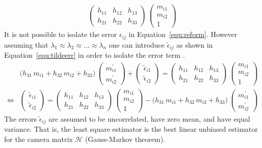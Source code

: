\documentclass[12pt,a4paper,oneside,openright]{book}
\newcommand{\Ie}{That is, }
\newcommand{\equ}[1]{Equation~\ref{equ:#1}}
\begin{document}
\begin{CJK}{UTF8}{}
\begin{equation}
\begin{split}
    \begin{pmatrix}h_{11}&h_{12}&h_{13}\\h_{21}&h_{22}&h_{33}\end{pmatrix}\,
    \begin{pmatrix}m_{i1}\\m_{i2}\\1\end{pmatrix}
  \end{split}
\end{equation}
It is not possible to isolate the error $\epsilon_{ij}$ in \equ{reform}. However assuming that $\lambda_1\approx\lambda_2\approx\ldots\approx\lambda_n$ one can introduce $\widetilde{\epsilon}_{ij}$ as shown in \equ{tildeerr} in order to isolate the error term \citep{zhang2000flexible}.
\begin{equation}\label{equ:tildeerr}
  \begin{split}
    &\big(h_{31}\,m_{i1}+h_{32}\,m_{i2}+h_{33}\big)\,\begin{pmatrix}m^\prime_{i1}\\m^\prime_{i2}\end{pmatrix}+
    \begin{pmatrix}\widetilde{\epsilon}_{i1}\\\widetilde{\epsilon}_{i2}\end{pmatrix}=
    \begin{pmatrix}h_{11}&h_{12}&h_{13}\\h_{21}&h_{22}&h_{33}\end{pmatrix}\,
    \begin{pmatrix}m_{i1}\\m_{i2}\\1\end{pmatrix}\\
    \Leftrightarrow&\begin{pmatrix}\widetilde{\epsilon}_{i1}\\\widetilde{\epsilon}_{i2}\end{pmatrix}=
    \begin{pmatrix}h_{11}&h_{12}&h_{13}\\h_{21}&h_{22}&h_{33}\end{pmatrix}\,
    \begin{pmatrix}m_{i1}\\m_{i2}\\1\end{pmatrix}-
    \big(h_{31}\,m_{i1}+h_{32}\,m_{i2}+h_{33}\big)\,\begin{pmatrix}m^\prime_{i1}\\m^\prime_{i2}\end{pmatrix}
  \end{split}
\end{equation}
The errors $\widetilde{\epsilon}_{ij}$ are assumed to be uncorrelated, have zero mean, and have equal variance. \Ie the least square estimator is the best linear unbiased estimator for the camera matrix $\mathcal{H}$ (Gauss-Markov theorem).


\end{CJK}
\end{document}
